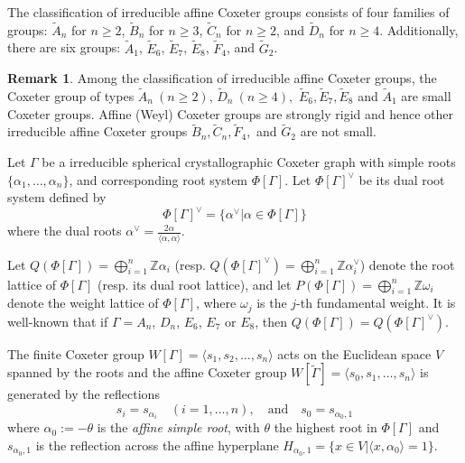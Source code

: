 \documentclass[12pt]{amsart}
\theoremstyle{definition}
\newtheorem{remark}[equation]{Remark}
\numberwithin{equation}{section}
\begin{document}
The classification of irreducible affine Coxeter groups consists of four families of groups: $ \tilde{A}_n $ for $ n \geq 2 $, $ \tilde{B}_n $ for $ n \geq 3 $, $ \tilde{C}_n $ for $ n \geq 2$, and $ \tilde{D}_n $ for $ n \geq 4 $. Additionally, there are six groups: $\tilde{A}_1$, $ \tilde{E}_6 $, $ \tilde{E}_7 $, $ \tilde{E}_8 $, $ \tilde{F}_4 $, and $ \tilde{G}_2$.

 \begin{remark}
 Among the classification of irreducible affine Coxeter groups, the Coxeter group of types $\tilde{A}_n \ (n \geq 2)$,  $\tilde{D}_n \ (n \geq 4),$ $\tilde{E}_6, \tilde{E}_7,  \tilde{E}_8$ and $\tilde{A}_1$ are small Coxeter groups. Affine (Weyl) Coxeter groups are strongly rigid \cite[Main Theorem]{MR1760693} and hence other irreducible affine Coxeter groups $\tilde{B}_n,  \tilde{C}_n, \tilde{F}_4,$ and $\widetilde{G}_2$  are not small.
  \end{remark}

Let $\Gamma$ be a irreducible spherical crystallographic Coxeter graph with simple roots $\{\alpha_1, \ldots, \alpha_n\}$, and corresponding root system $\Phi[\Gamma]$. Let $\Phi[\Gamma]^\vee$ be its dual root system defined by 
$$
\Phi[\Gamma]^\vee=\{\alpha^\vee | \alpha \in \Phi[\Gamma]\}
$$
where the dual roots  $\alpha^\vee = \frac{2\alpha}{\langle \alpha, \alpha \rangle}. $ 


Let $Q(\Phi[\Gamma])=\bigoplus_{i=1}^n \mathbb{Z} \alpha_i$ (resp. $Q(\Phi[\Gamma]^\vee)=\bigoplus_{i=1}^n \mathbb{Z} \alpha_i^\vee$) denote the root lattice of $\Phi[\Gamma]$ (resp. its dual root lattice),  and let $P(\Phi[\Gamma])= \bigoplus_{i=1}^n \mathbb{Z} \omega_i$ denote the weight lattice of $\Phi[\Gamma]$, where $\omega_j$ is the $j$-th fundamental weight. It is well-known that if $\Gamma= A_n$, $D_n$, $E_6$, $E_7$ or $E_8$, then $Q(\Phi[\Gamma])=Q(\Phi[\Gamma]^\vee)$.





The finite Coxeter group $W[\Gamma] = \langle s_1, s_2, \dots, s_n \rangle$ acts on the Euclidean space $V$ spanned by the roots and the affine Coxeter group $W[\tilde{\Gamma}] = \langle s_0, s_1, \dots, s_n \rangle$
is generated by the reflections
$$
s_i = s_{\alpha_i} \quad (i=1, \dots, n), \quad \text{and} \quad s_0 = s_{\alpha_0,1}
$$
where $\alpha_0 := -\theta$ is the {\it affine simple root}, with $\theta$ the highest root in $\Phi[\Gamma]$ and $s_{\alpha_0,1}$ is the reflection across the affine hyperplane $H_{\alpha_0,1}=\{x\in V | \langle x,\alpha_0 \rangle=1\}$.
\end{document}
